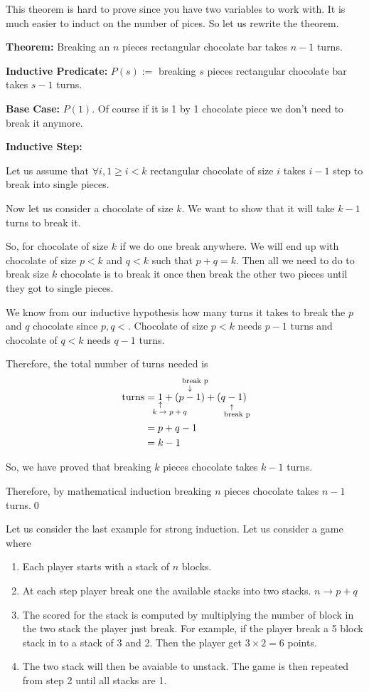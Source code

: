 \documentclass[a4paper, 12pt]{article}
\newcommand{\theorem}{\noindent\textbf{Theorem:} }
\newcommand{\predicate}{\noindent\textbf{Inductive Predicate:} }
\newcommand{\inductivestep}{\noindent\textbf{Inductive Step:} }
\newcommand{\basecase}{\noindent\textbf{Base Case:} }
\newcommand{\qedd}{\qed\newline}
\newcommand{\expl}[2]{%
	\underset{\substack{\uparrow\\\mathrlap{\text{\hspace{-1em}#2}}}}{#1}}
\newcommand{\uexpl}[2]{%
	\overset{\substack{\mathrlap{\text{\hspace{-1em}#2}}\\\downarrow}}{#1}}
\theoremstyle{examplestyle}
\begin{document}
\begin{multicols}{2}
This theorem is hard to prove since you have two variables to work with. It is much easier to induct on the number of pices. So let us rewrite the theorem.

\theorem Breaking an $n$ pieces rectangular chocolate bar takes $n-1$ turns.

\predicate $P(s):=$ breaking $s$ pieces rectangular chocolate bar takes $s-1$ turns.

\basecase $P(1)$. Of course if it is 1 by 1 chocolate piece we don't need to break it anymore. \checkmark

\inductivestep

Let us assume that $\forall i, 1 \ge i < k$ rectangular chocolate of size $i$ takes $i-1$ step to break into single pieces.

Now let us consider a chocolate of size $k$. We want to show that it will take $k-1$ turns to break it.

So, for chocolate of size $k$ if we do one break anywhere. We will end up with chocolate of size $p<k$ and $q<k$ such that $p+q=k$. Then all we need to do to break size $k$ chocolate is to break it once then break the other two pieces until they got to single pieces.

We know from our inductive hypothesis how many turns it takes to break the $p$ and $q$ chocolate since $p,q <$. Chocolate of size $p<k$ needs $p-1$ turns and chocolate of $q<k$ needs $q-1$ turns.

Therefore, the total number of turns needed is
\begin{align*}
	\text{turns} &= \expl{1}{$k \to p+q$} + \uexpl{(p -1)}{\text{break }p} + \expl{(q -1)}{\text{break }p}\\
	&=  p+q-1\\
	&= k-1
\end{align*}

So, we have proved that breaking $k$ pieces chocolate takes $k-1$ turns.

Therefore, by mathematical induction breaking $n$ pieces chocolate takes $n-1$ turns.\qedd

Let us consider the last example for strong induction. Let us consider a game where
\begin{enumerate}
	\item Each player starts with a stack of $n$ blocks.
	\item At each step player break one the available stacks into two stacks. $n \to p+q$
	\item The scored for the stack is computed by multiplying the number of block in the two stack the player just break. For example, if the player break a 5 block stack in to a stack of 3 and 2. Then the player get $3\times 2 = 6$ points.
	\item The two stack will then be avaiable to unstack. The game is then repeated from step 2 until all stacks are 1. 
\end{enumerate}


\end{multicols}
\end{document}
